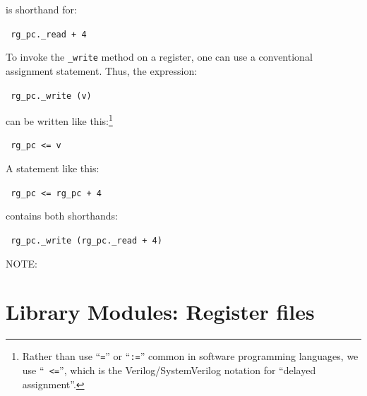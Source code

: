 is shorthand for:

\begin{tabbing}\footnotesize\tt
\hmmmm  rg\_pc.\_read + 4
\end{tabbing}

To invoke the \verb|_write| method on a register, one can use a
conventional assignment statement.  Thus, the expression:

\begin{tabbing}\footnotesize\tt
\hmmmm rg\_pc.\_write (v)
\end{tabbing}

can be written like this:\footnote{Rather than use ``{\tt =}'' or
``{\tt :=}'' common in software programming languages, we use ``{\tt
<=}'', which is the Verilog/SystemVerilog notation for ``delayed
assignment''.}

\begin{tabbing}\footnotesize\tt
\hmmmm rg\_pc <= v
\end{tabbing}

A statement like this:

\begin{tabbing}\footnotesize\tt
\hmmmm rg\_pc <= rg\_pc + 4
\end{tabbing}

contains both shorthands:

\begin{tabbing}\footnotesize\tt
\hmmmm rg\_pc.\_write (rg\_pc.\_read + 4)
\end{tabbing}

\vspace{2ex}

NOTE: 


\section{{\BSV} Library Modules: Register files}

